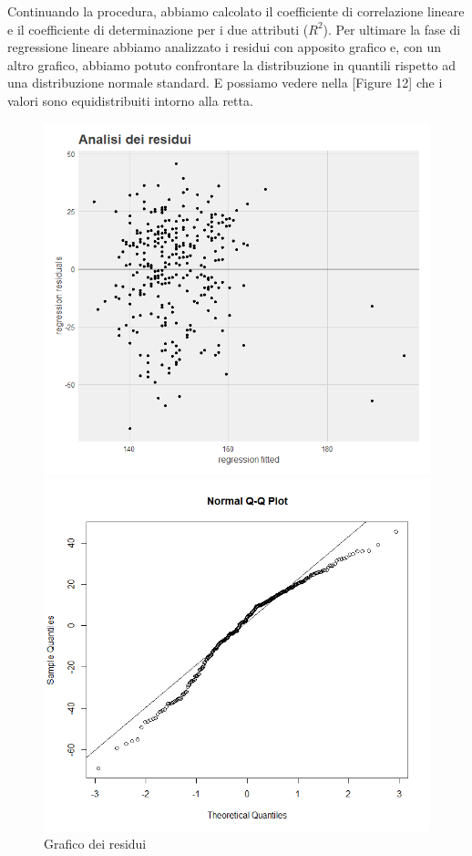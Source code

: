 \documentclass{article}
\begin{document}
Continuando la procedura, abbiamo calcolato il coefficiente di correlazione lineare e il coefficiente di determinazione per i due attributi ($R^2$). Per ultimare la fase di regressione lineare abbiamo analizzato i residui con apposito grafico e, con un altro grafico, abbiamo potuto confrontare la distribuzione in quantili rispetto ad una distribuzione normale standard. E possiamo vedere nella [Figure 12] che i valori sono equidistribuiti intorno alla retta.
 
\begin{figure}[!htb]
   \begin{minipage}{0.475\textwidth}
     \centering
     \includegraphics[width=1\linewidth]{analisi residui}
     \caption{Grafico dei residui}
     \label{Fig:ds1}
   \end{minipage}\hfill
   \begin{minipage}{0.475\textwidth}
     \centering
     \includegraphics[width=1\linewidth]{qq plot}

\end{minipage}
\end{figure}
\end{document}
